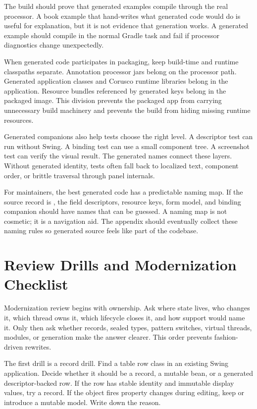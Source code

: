 The build should prove that generated examples compile through the real processor. A book example that hand-writes what generated code would do is useful for explanation, but it is not evidence that generation works. A generated example should compile in the normal Gradle task and fail if processor diagnostics change unexpectedly.

When generated code participates in packaging, keep build-time and runtime classpaths separate. Annotation processor jars belong on the processor path. Generated application classes and Corusco runtime libraries belong in the application. Resource bundles referenced by generated keys belong in the packaged image. This division prevents the packaged app from carrying unnecessary build machinery and prevents the build from hiding missing runtime resources.

Generated companions also help tests choose the right level. A descriptor test can run without Swing. A binding test can use a small component tree. A screenshot test can verify the visual result. The generated names connect these layers. Without generated identity, tests often fall back to localized text, component order, or brittle traversal through panel internals.

For maintainers, the best generated code has a predictable naming map. If the source record is , the field descriptors, resource keys, form model, and binding companion should have names that can be guessed. A naming map is not cosmetic; it is a navigation aid. The appendix should eventually collect these naming rules so generated source feels like part of the codebase.

\section{Review Drills and Modernization Checklist}

Modernization review begins with ownership. Ask where state lives, who changes it, which thread owns it, which lifecycle closes it, and how support would name it. Only then ask whether records, sealed types, pattern switches, virtual threads, modules, or generation make the answer clearer. This order prevents fashion-driven rewrites.

The first drill is a record drill. Find a table row class in an existing Swing application. Decide whether it should be a record, a mutable bean, or a generated descriptor-backed row. If the row has stable identity and immutable display values, try a record. If the object fires property changes during editing, keep or introduce a mutable model. Write down the reason.

